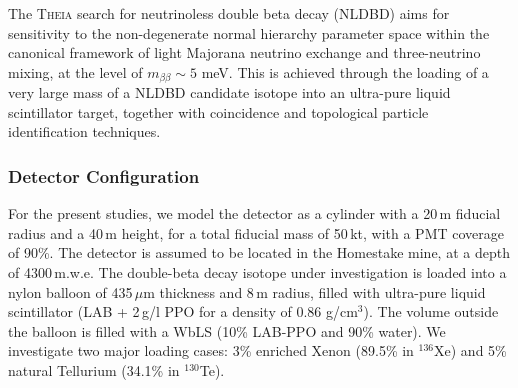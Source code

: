 %
%
%
%
%

The \textsc{Theia} search for neutrinoless double beta decay (NLDBD) aims for
sensitivity to the non-degenerate normal hierarchy parameter space
within the canonical framework of light Majorana neutrino exchange and
three-neutrino mixing, at the level of $m_{\beta\beta}\sim5$ meV.
This is achieved through the loading of a very large
mass of a NLDBD candidate isotope into an ultra-pure liquid scintillator
target, together with coincidence and topological particle identification
techniques.

\subsubsection{Detector Configuration}

For the present studies, we model the detector as a cylinder with a 20\,m fiducial radius and a 40\,m height, for a total fiducial mass of 50\,kt, with a PMT coverage of 90\%. The detector is assumed to be located in the Homestake mine, at a depth of 4300\,m.w.e. The double-beta decay isotope under investigation is loaded into a nylon balloon of 435\,$\mu$m thickness and 8\,m radius, filled with ultra-pure liquid scintillator (LAB + 2\,g/l PPO for a density of 0.86 g/cm$^3$). The volume outside the balloon is filled with a WbLS (10\% LAB-PPO and 90\% water). We investigate two major loading cases: 3\% enriched Xenon (89.5\% in $^{136}$Xe) and 5\% natural Tellurium (34.1\% in $^{130}$Te).

